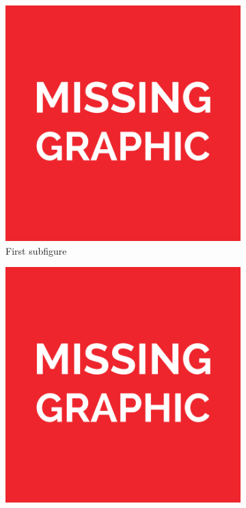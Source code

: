 \begin{figure}
    \centering
    \begin{subfigure}{0.28\textwidth}
        \includegraphics[width=\textwidth] {media/missing-graphic-square.pdf}
        \caption{First subfigure}
    \end{subfigure}
    \begin{subfigure}{0.28\textwidth}
        \includegraphics[width=\textwidth] {media/missing-graphic-square.pdf}

\end{subfigure}
\end{figure}

